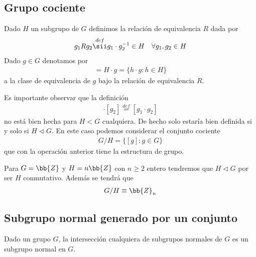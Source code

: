 \subsection{Grupo cociente}

\begin{definicion}
    Dado $H$ un subgrupo de $G$ definimos la relación de equivalencia $R$ dada por 
    \begin{gather*}
        g_1 R g_2 \overset{def}{\sii} g_1\cdot g_2^{-1}\in H\ \ \ \forall g_1,g_2\in H
    \end{gather*}
    Dado $g\in G$ denotamos por 
    \begin{gather*}
        [g]=H\cdot g = \{h\cdot g : h\in H\}
    \end{gather*}
    a la clase de equivalencia de $g$ bajo la relación de equivalencia $R$.
\end{definicion}

\begin{observacion}
    Es importante observar que la definición
    \begin{gather*}
        [g_1] \cdot [g_2] \overset{def}{=} [g_1\cdot g_2]
    \end{gather*}
    no está bien hecha para $H<G$ cualquiera. De hecho solo estaría bien definida si y solo si $H\lhd G$. En este caso podemos considerar el conjunto cociente 
    \begin{gather*}
        G/H = \{[g] : g\in G\}
    \end{gather*}
    que con la operación anterior tiene la estructura de grupo.
\end{observacion}

\begin{ejemplo}
    Para $G=\bb{Z}$ y $H=n\bb{Z}$ con $n\geq 2$ entero tendremos que $H\lhd G$ por ser $H$ conmutativo. Además se tendrá que 
    \begin{gather*}
        G/H \equiv \bb{Z}_n
    \end{gather*}
\end{ejemplo}

\subsection{Subgrupo normal generado por un conjunto}

\begin{observacion}
    Dado un grupo $G$, la intersección cualquiera de subgrupos normales de $G$ es un subgrupo normal en $G$.
\end{observacion}

